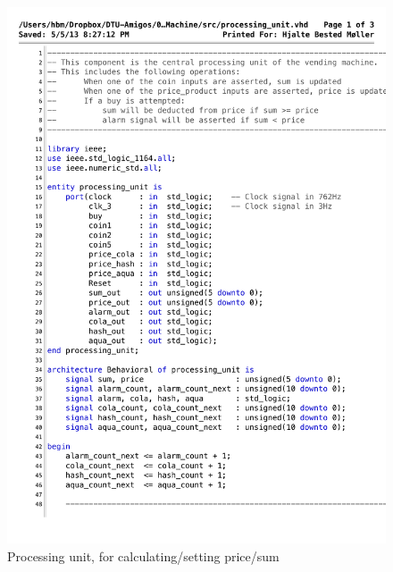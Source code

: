 \begin{figure}[!h]
\centering
\includegraphics[scale=0.6]{figs/processing_unit.pdf}
\caption{Processing unit, for calculating/setting price/sum}
\label{vhd:proceunit1}
\end{figure}


